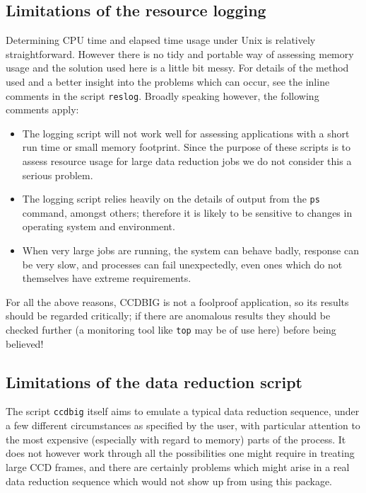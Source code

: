 \subsection{Limitations of the resource logging}

Determining CPU time and elapsed time usage under Unix 
is relatively straightforward. 
However there is no tidy and portable way of
assessing memory usage and the solution used here is
a little bit messy.
For details of the method used and a better insight into
the problems which can occur, see the inline comments in 
the script {\tt reslog}.
Broadly speaking however, the following comments apply:
\begin{itemize}
%
\item
The logging script will not work well for assessing applications
with a short run time or small memory footprint.  
Since the purpose of these scripts is to assess resource usage
for large data reduction jobs we do not consider this a serious problem.
%
\item
The logging script relies heavily on the details of output from 
the {\tt ps} command, amongst others; therefore it is 
likely to be sensitive to changes in operating system and environment.
%
\item
When very large jobs are running, 
the system can behave badly,
response can be very slow,
and processes can fail unexpectedly, even ones which 
do not themselves have extreme requirements.
\end{itemize}
For all the above reasons, CCDBIG is not a foolproof application,
so its results should be regarded critically; 
if there are anomalous results they should be checked further 
(a monitoring tool like {\tt top} may be of use here)
before being believed!


\subsection{Limitations of the data reduction script}

The script {\tt ccdbig} itself aims to 
emulate a typical data reduction sequence,
under a few different circumstances 
as specified by the user,
with particular attention to the most expensive (especially with 
regard to memory) parts of the process.
It does not however work through all the possibilities 
one might require in treating large CCD frames,
and there are certainly problems which might arise
in a real data reduction sequence which would not show
up from using this package.

